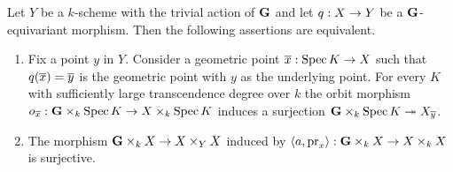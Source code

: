 \begin{proposition}\label{proposition:fibers_are_geometric_orbits}
Let $Y$ be a $k$-scheme with the trivial action of $\mathbf{G}$ and let $q:X\rightarrow Y$ be a $\mathbf{G}$-equivariant morphism. Then the following assertions are equivalent.
\begin{enumerate}[label=\emph{\textbf{(\roman*)}}, leftmargin=3.0em]
\item Fix a point $y$ in $Y$. Consider a geometric point $\overline{x}:\mathrm{Spec}\, K\rightarrow X$ such that $q(\overline{x}) = \overline{y}$ is the geometric point with $y$ as the underlying point. For every $K$ with sufficiently large transcendence degree over $k$ the orbit morphism $o_{\overline{x}}:\mathbf{G}\times_k\mathrm{Spec}\, K\rightarrow X\times_k\mathrm{Spec}\, K$ induces a surjection $\mathbf{G}\times_k\mathrm{Spec}\, K\twoheadrightarrow X_{\overline{y}}$.
\item The morphism $\mathbf{G}\times_kX\rightarrow X\times_YX$ induced by $\langle a, \mathrm{pr}_x\rangle:\mathbf{G}\times_kX \rightarrow X\times_kX$ is surjective.
\end{enumerate}
\end{proposition}
